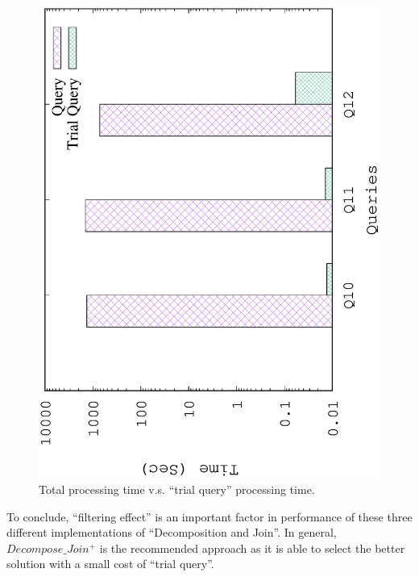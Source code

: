 \begin{figure}[H]
	\centering
	\includegraphics[scale=0.5, angle=270]{plot/threesample.eps}
	\caption{Total processing time v.s. ``trial query'' processing time.}
	\label{fig:threesample}
\end{figure}

To conclude, ``filtering effect'' is an important factor in performance of these three different implementations of ``Decomposition and Join''. In general, $Decompose\_Join^{+}$ is the recommended approach as it is able to select the better solution with a small cost of ``trial query''.


%

